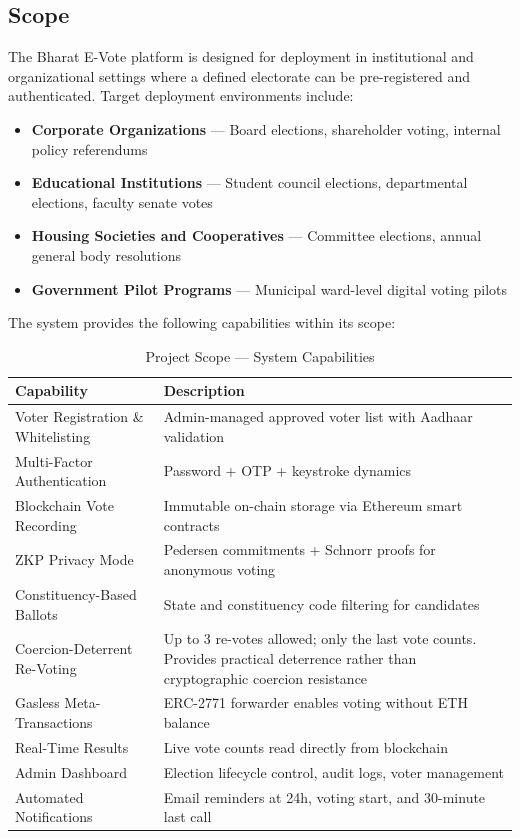 \documentclass[oneside,a4paper,12pt]{book}
\begin{document}
\subsection{Scope}
The Bharat E-Vote platform is designed for deployment in institutional and organizational settings where a defined electorate can be pre-registered and authenticated. Target deployment environments include:
\begin{itemize}[leftmargin=1.5cm]
    \item \textbf{Corporate Organizations} --- Board elections, shareholder voting, internal policy referendums
    \item \textbf{Educational Institutions} --- Student council elections, departmental elections, faculty senate votes
    \item \textbf{Housing Societies and Cooperatives} --- Committee elections, annual general body resolutions
    \item \textbf{Government Pilot Programs} --- Municipal ward-level digital voting pilots
\end{itemize}

\vspace{0.3cm}
The system provides the following capabilities within its scope:

\begin{table}[htbp]
\centering
\renewcommand{\arraystretch}{1.3}
\small
\begin{tabularx}{\textwidth}{|p{4cm}|X|}
\hline
\textbf{Capability} & \textbf{Description} \\
\hline
Voter Registration \& Whitelisting & Admin-managed approved voter list with Aadhaar validation \\
\hline
Multi-Factor Authentication & Password + OTP + keystroke dynamics \\
\hline
Blockchain Vote Recording & Immutable on-chain storage via Ethereum smart contracts \\
\hline
ZKP Privacy Mode & Pedersen commitments + Schnorr proofs for anonymous voting \\
\hline
Constituency-Based Ballots & State and constituency code filtering for candidates \\
\hline
Coercion-Deterrent Re-Voting & Up to 3 re-votes allowed; only the last vote counts. Provides practical deterrence rather than cryptographic coercion resistance \\
\hline
Gasless Meta-Transactions & ERC-2771 forwarder enables voting without ETH balance \\
\hline
Real-Time Results & Live vote counts read directly from blockchain \\
\hline
Admin Dashboard & Election lifecycle control, audit logs, voter management \\
\hline
Automated Notifications & Email reminders at 24h, voting start, and 30-minute last call \\
\hline
\end{tabularx}
\caption{Project Scope --- System Capabilities}
\label{tab:scope}
\end{table}
\end{document}
